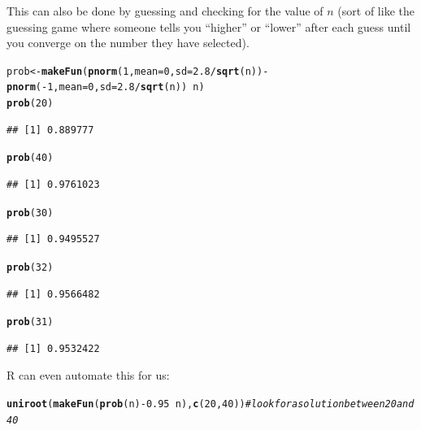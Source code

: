 \documentclass[twoside]{book}\usepackage[]{graphicx}\usepackage[]{xcolor}
\makeatletter
\newcommand{\hlnum}[1]{\textcolor[rgb]{0.686,0.059,0.569}{#1}}%
\newcommand{\hlcom}[1]{\textcolor[rgb]{0.678,0.584,0.686}{\textit{#1}}}%
\newcommand{\hlopt}[1]{\textcolor[rgb]{0,0,0}{#1}}%
\newcommand{\hlstd}[1]{\textcolor[rgb]{0.345,0.345,0.345}{#1}}%
\newcommand{\hlkwb}[1]{\textcolor[rgb]{0.69,0.353,0.396}{#1}}%
\newcommand{\hlkwc}[1]{\textcolor[rgb]{0.333,0.667,0.333}{#1}}%
\newcommand{\hlkwd}[1]{\textcolor[rgb]{0.737,0.353,0.396}{\textbf{#1}}}%
\newenvironment{kframe}{%
 \def\at@end@of@kframe{}%
 \ifinner\ifhmode%
  \def\at@end@of@kframe{\end{minipage}}%
  \begin{minipage}{\columnwidth}%
 \fi\fi%
 \def\FrameCommand##1{\hskip\@totalleftmargin \hskip-\fboxsep
 \colorbox{shadecolor}{##1}\hskip-\fboxsep
     \hskip-\linewidth \hskip-\@totalleftmargin \hskip\columnwidth}%
 \MakeFramed {\advance\hsize-\width
   \@totalleftmargin\z@ \linewidth\hsize
   \@setminipage}}%
 {\par\unskip\endMakeFramed%
 \at@end@of@kframe}
\newenvironment{knitrout}{}{} %
\makeatother
\begin{document}
\begin{solution}
\begin{enumerate}
			 This can also be done by guessing and checking for the value of $n$ (sort of like the 
			 guessing game where someone tells you ``higher'' or ``lower'' after each guess until 
			 you converge on the number they have selected).
\begin{knitrout}
\color{fgcolor}\begin{kframe}
\begin{alltt}
\hlstd{prob} \hlkwb{<-} \hlkwd{makeFun}\hlstd{(} \hlkwd{pnorm}\hlstd{(} \hlnum{1}\hlstd{,} \hlkwc{mean}\hlstd{=}\hlnum{0}\hlstd{,} \hlkwc{sd}\hlstd{=}\hlnum{2.8}\hlopt{/}\hlkwd{sqrt}\hlstd{(n) )} \hlopt{-} \hlkwd{pnorm}\hlstd{(} \hlopt{-}\hlnum{1}\hlstd{,} \hlkwc{mean}\hlstd{=}\hlnum{0}\hlstd{,} \hlkwc{sd}\hlstd{=}\hlnum{2.8}\hlopt{/}\hlkwd{sqrt}\hlstd{(n) )} \hlopt{~} \hlstd{n )}
\hlkwd{prob}\hlstd{(}\hlnum{20}\hlstd{)}
\end{alltt}
\begin{verbatim}
## [1] 0.889777
\end{verbatim}
\begin{alltt}
\hlkwd{prob}\hlstd{(}\hlnum{40}\hlstd{)}
\end{alltt}
\begin{verbatim}
## [1] 0.9761023
\end{verbatim}
\begin{alltt}
\hlkwd{prob}\hlstd{(}\hlnum{30}\hlstd{)}
\end{alltt}
\begin{verbatim}
## [1] 0.9495527
\end{verbatim}
\begin{alltt}
\hlkwd{prob}\hlstd{(}\hlnum{32}\hlstd{)}
\end{alltt}
\begin{verbatim}
## [1] 0.9566482
\end{verbatim}
\begin{alltt}
\hlkwd{prob}\hlstd{(}\hlnum{31}\hlstd{)}
\end{alltt}
\begin{verbatim}
## [1] 0.9532422
\end{verbatim}
\end{kframe}
\end{knitrout}
R can even automate this for us:
\begin{knitrout}
\color{fgcolor}\begin{kframe}
\begin{alltt}
\hlkwd{uniroot}\hlstd{(}\hlkwd{makeFun}\hlstd{(} \hlkwd{prob}\hlstd{(n)} \hlopt{-} \hlnum{0.95} \hlopt{~} \hlstd{n ),} \hlkwd{c}\hlstd{(}\hlnum{20}\hlstd{,} \hlnum{40}\hlstd{) )}  \hlcom{# look for a solution between 20 and 40}

\end{alltt}
\end{kframe}
\end{knitrout}
\end{enumerate}
\end{solution}
\end{document}
